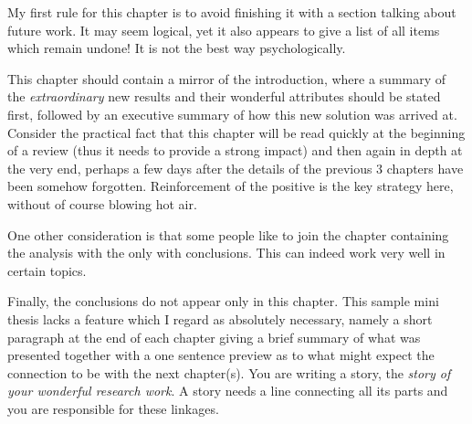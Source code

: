 \label{concl}

My first rule for this chapter is to avoid finishing it with a section talking about future work. It may seem logical, yet it also appears to give a list of all items which remain undone! It is not the best way psychologically.

This chapter should contain a mirror of the introduction, where a summary of the \textit{extraordinary} new results and their wonderful attributes should be stated first, followed by an executive summary of how this new solution was arrived at. Consider the practical fact that this chapter will be read quickly at the beginning of a review (thus it needs to provide a strong impact) and then again in depth at the very end, perhaps a few days after the details of the previous 3 chapters have been somehow forgotten. Reinforcement of the positive is the key strategy here, without of course blowing hot air.

One other consideration is that some people like to join the chapter containing the analysis with the only with conclusions. This can indeed work very well in certain topics.

Finally, the conclusions do not appear only in this chapter. This sample mini thesis lacks a feature which I regard as absolutely necessary, namely a short paragraph at the end of each chapter giving a brief summary of what was presented together with a one sentence preview as to what might expect the connection to be with the next chapter(s). You are writing a story, the \textit{story of your wonderful research work}. A story needs a line connecting all its parts and you are responsible for these linkages.
